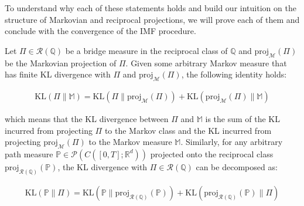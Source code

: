 \documentclass{article}
\begin{document}
To understand why each of these statements holds and build our intuition on the structure of Markovian and reciprocal projections, we will prove each of them and conclude with the convergence of the IMF procedure.

\begin{lemma}\label{lemma:imf-pythagorean-thm}
    Let $\Pi\in \mathcal{R}(\mathbb{Q})$ be a bridge measure in the reciprocal class of $\mathbb{Q}$ and $\text{proj}_{\mathcal{M}}(\Pi)$ be the Markovian projection of $\Pi$. Given some arbitrary Markov measure that has finite KL divergence with $\Pi$ and $\text{proj}_{\mathcal{M}}(\Pi)$, the following identity holds:
    \begin{small}
    \begin{align}
        \text{KL}(\Pi\|\mathbb{M})=\text{KL}(\Pi\|\text{proj}_{\mathcal{M}}(\Pi))+\text{KL}(\text{proj}_{\mathcal{M}}(\Pi)\|\mathbb{M})\tag{Markovian Projection Identity}\label{eq:markovian-proj-identity}
    \end{align}
    \end{small}
    which means that the KL divergence between $\Pi$ and $\mathbb{M}$ is the sum of the KL incurred from projecting $\Pi$ to the Markov class and the KL incurred from projecting $\text{proj}_{\mathcal{M}}(\Pi)$ to the Markov measure $\mathbb{M}$. Similarly, for any arbitrary path measure $\mathbb{P}\in \mathcal{P}(C([0,T];\mathbb{R}^d))$ projected onto the reciprocal class $\text{proj}_{\mathcal{R}(\mathbb{Q})}(\mathbb{P})$, the KL divergence with $\Pi\in \mathcal{R}(\mathbb{Q})$ can be decomposed as:
    \begin{small}
    \begin{align}
        \text{KL}(\mathbb{P}\|\Pi)=\text{KL}(\mathbb{P}\|\text{proj}_{\mathcal{R}(\mathbb{Q})}(\mathbb{P}))+\text{KL}(\text{proj}_{\mathcal{R}(\mathbb{Q})}(\mathbb{P})\|\Pi)\tag{Reciprocal Projection Identity}\label{eq:reciprocal-proj-identity}
    \end{align}
    \end{small}
\end{lemma}
\end{document}
